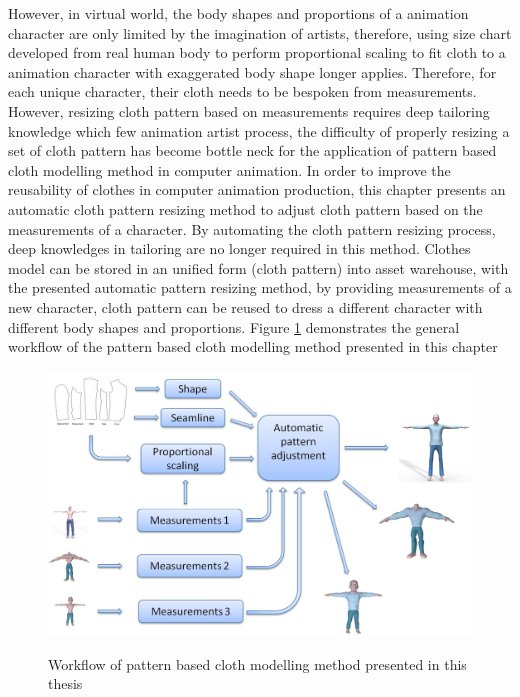 However, in virtual world, the body shapes and proportions of a animation character are only limited by the imagination of artists, therefore, using size chart developed from real human body to perform proportional scaling to fit cloth to a animation character with exaggerated body shape longer applies. Therefore, for each unique character, their cloth needs to be bespoken from measurements. However, resizing cloth pattern based on measurements requires deep tailoring knowledge which few animation artist process, the difficulty of properly resizing a set of cloth pattern has become bottle neck for the application of pattern based cloth modelling method in computer animation. In order to improve the reusability of clothes in computer animation production, this chapter presents an automatic cloth pattern resizing method to adjust cloth pattern based on the measurements of a character. By automating the cloth pattern resizing process, deep knowledges in tailoring are no longer required in this method. Clothes model can be stored in an unified form (cloth pattern) into asset warehouse, with the presented automatic pattern resizing method, by providing measurements of a new character, cloth pattern can be reused to dress a different character with different body shapes and proportions. Figure \ref{figure:workflow} demonstrates the general workflow of the pattern based cloth modelling method presented in this chapter

 \begin{figure}[H]
    \centering
	\includegraphics[width=1\columnwidth]{../images/general_workflow}\\[1cm]
    \caption{Workflow of pattern based cloth modelling method presented in this thesis}
    \label{figure:workflow}
\end{figure} 


